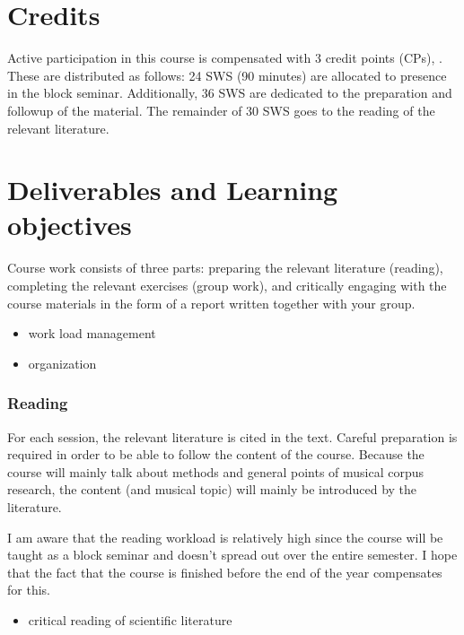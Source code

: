 \documentclass[letterpaper,10pt,english]{sphinxmanual}
\begin{document}
\section{Credits}
\label{\detokenize{1_orga:credits}}
Active participation in this course is compensated with 3 credit points (CPs),
.
These are distributed as follows: 24 SWS (90 minutes) are allocated to presence in the block seminar.
Additionally, 36 SWS are dedicated to the preparation and follow\sphinxhyphen{}up of the material.
The remainder of 30 SWS goes to the reading of the relevant literature.


\section{Deliverables and Learning objectives}
\label{\detokenize{1_orga:deliverables-and-learning-objectives}}
Course work consists of three parts: preparing the relevant literature (reading),
completing the relevant exercises (group work), and critically engaging with the course materials
in the form of a report written together with your group.
\begin{itemize}
\item {} 
work load management

\item {} 
organization

\end{itemize}
\subsubsection*{Reading}

For each session, the relevant literature is cited in the text.
Careful preparation is required in order to be able to follow the content of the course.
Because the course will mainly talk about methods and general points of musical corpus research,
the content (and musical topic) will mainly be introduced by the literature.

I am aware that the reading workload is relatively high since the course will be taught as a block seminar
and doesn’t spread out over the entire semester. I hope that the fact that the course is finished before the
end of the year compensates for this.
\begin{itemize}
\item {} 
critical reading of scientific literature

\end{itemize}
\end{document}
